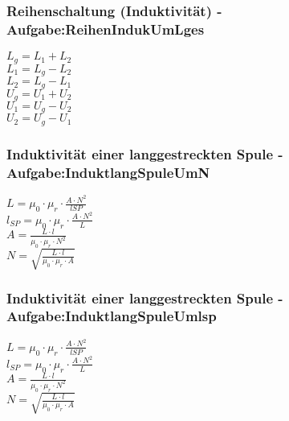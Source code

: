 \subsubsection{Reihenschaltung (Induktivität) - Aufgabe:ReihenIndukUmLges} 
\begin{minipage}{0.45\textwidth} 
$ L_{g}  = L_{1}  + L_{2} $\\ 
$ L_{1}  = L_{g}  - L_{2} $\\ 
$ L_{2}  = L_{g}  - L_{1} $\\ 
$ U_{g}  = U_{1}  + U_{2} $\\ 
$ U_{1}  = U_{g}  - U_{2} $\\ 
$ U_{2}  = U_{g}  - U_{1} $\\ 
\end{minipage} 
\begin{minipage}{0.45\textwidth} 
 
\end{minipage} 
\subsubsection{Induktivität einer langgestreckten Spule - Aufgabe:InduktlangSpuleUmN} 
\begin{minipage}{0.45\textwidth} 
$ L = \mu _{0} \cdot \mu _{r} \cdot \frac{A\cdot N^{2} }{lSP} $\\ 
$ l_{SP} = \mu _{0} \cdot \mu _{r} \cdot \frac{A\cdot N^{2} }{L} $\\ 
$ A = \frac{ L\cdot l}{\mu _{0} \cdot \mu _{r} \cdot N^{2} } $\\ 
$ N = \sqrt{\frac{ L\cdot l}{\mu _{0} \cdot \mu _{r} \cdot A}} $\\ 
\end{minipage} 
\begin{minipage}{0.45\textwidth} 
 
\end{minipage} 
\subsubsection{Induktivität einer langgestreckten Spule - Aufgabe:InduktlangSpuleUmlsp} 
\begin{minipage}{0.45\textwidth} 
$ L = \mu _{0} \cdot \mu _{r} \cdot \frac{A\cdot N^{2} }{lSP} $\\ 
$ l_{SP} = \mu _{0} \cdot \mu _{r} \cdot \frac{A\cdot N^{2} }{L} $\\ 
$ A = \frac{ L\cdot l}{\mu _{0} \cdot \mu _{r} \cdot N^{2} } $\\ 
$ N = \sqrt{\frac{ L\cdot l}{\mu _{0} \cdot \mu _{r} \cdot A}} $\\ 
\end{minipage} 
\begin{minipage}{0.45\textwidth} 
 
\end{minipage} 
